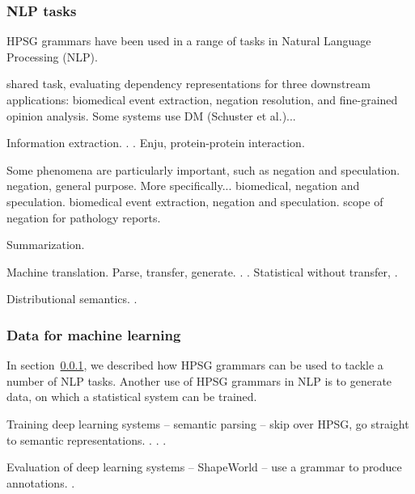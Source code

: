 \documentclass[output=paper,nonflat]{langsci/langscibook}
\begin{document}
\subsubsection{NLP tasks}
\label{cl:downstream:nlp}

HPSG grammars have been used in a range of tasks
in Natural Language Processing (NLP).

\citet{oepen2017extrinsic} shared task,
evaluating dependency representations for three downstream applications:
biomedical event extraction, negation resolution, and fine-grained opinion analysis.
Some systems use DM (Schuster et al.)...

Information extraction.
\citet{schaefer2011acl}.
\citet{reiplinger2012glossary}.
\citet{miyao2008protein} Enju, protein-protein interaction.

Some phenomena are particularly important, such as negation and speculation.
\citet{packard2014neg} negation, general purpose.
More specifically...
\citet{velldal2012specneg} biomedical, negation and speculation.
\citet{mackinlay2012biomed} biomedical event extraction, negation and speculation.
\citet{zamaraeva2018pathology} scope of negation for pathology reports.

Summarization.
\citet{fang2016summarise}

Machine translation.
Parse, transfer, generate.
\citep{OVL2007a-u,bond2011deep}.
\citet{goodman2018translate}.
Statistical without transfer,
\citet{horvat2017translate}.

Distributional semantics.
\citet{emerson2018functional}.




\subsubsection{Data for machine learning}
\label{cl:downstream:data}

In section~\ref{cl:downstream:nlp},
we described how HPSG grammars can be used to tackle a number of NLP tasks.
Another use of HPSG grammars in NLP
is to generate data, on which a statistical system can be trained.

Training deep learning systems
-- semantic parsing
-- skip over HPSG, go straight to semantic representations.
\citep{oepen2014semeval,oepen2015semeval}.
\citet{buys2017parse}.
\citet{chen2018parse}.

Evaluation of deep learning systems
-- ShapeWorld
-- use a grammar to produce annotations.
\citet{kuhnle2018shapeworld}.
\end{document}
